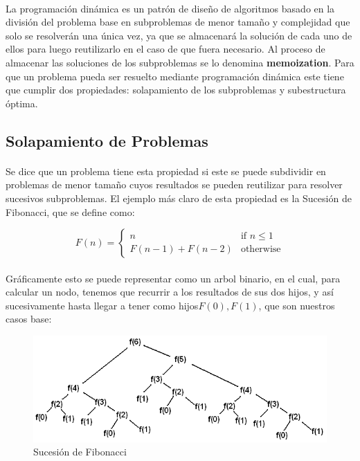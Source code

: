 \documentclass{article}
\begin{document}
		\paragraph{}
		La programación dinámica es un patrón de diseño de algoritmos basado en la división del problema base en subproblemas de menor tamaño y complejidad que solo se resolverán una única vez, ya que se almacenará la solución de cada uno de ellos para luego reutilizarlo en el caso de que fuera necesario. Al proceso de almacenar las soluciones de los subproblemas se lo denomina \textbf{memoization}. Para que un problema pueda ser resuelto mediante programación dinámica este tiene que cumplir dos propiedades: solapamiento de los subproblemas y subestructura óptima.

	\subsection{Solapamiento de Problemas}
		\paragraph{}
		Se dice que un problema tiene esta propiedad si este se puede subdividir en problemas de menor tamaño cuyos resultados se pueden reutilizar para resolver sucesivos subproblemas. El ejemplo más claro de esta propiedad es la Sucesión de Fibonacci, que se define como:

		\[
   		 F(n)=
			\begin{cases}
    				n					& \text{if } n\leq 1\\
    				F( n - 1) + F(n - 2)		& \text{otherwise}
			\end{cases}
		\]

		\paragraph{}
		Gráficamente esto se puede representar como un arbol binario, en el cual, para calcular un nodo, tenemos que recurrir a los resultados de sus dos hijos, y así sucesivamente hasta llegar a tener como hijos$F(0), F(1)$, que son nuestros casos base:

		\begin{figure}[H]
				\centering
				\includegraphics[width=120mm]{../res/fibonacci-sequence.png}
				\caption{Sucesión de Fibonacci \label{example_border}}
		\end{figure}
\end{document}
